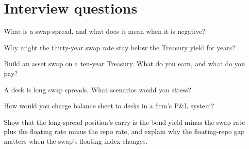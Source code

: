 \section{Interview questions}

\begin{interviewq}\label{iq:s2:swap-spread-and-asset-swap-trades:1}
What is a swap spread, and what does it mean when it is negative?
\end{interviewq}

\begin{interviewq}\label{iq:s2:swap-spread-and-asset-swap-trades:2}
Why might the thirty-year swap rate stay below the Treasury yield for years?
\end{interviewq}

\begin{interviewq}\label{iq:s2:swap-spread-and-asset-swap-trades:3}
Build an asset swap on a ten-year Treasury. What do you earn, and what do you pay?
\end{interviewq}

\begin{interviewq}\label{iq:s2:swap-spread-and-asset-swap-trades:4}
A desk is long swap spreads. What scenarios would you stress?
\end{interviewq}

\begin{interviewq}\label{iq:s2:swap-spread-and-asset-swap-trades:5}
How would you charge balance sheet to desks in a firm's P\&L system?
\end{interviewq}

\begin{interviewq}\label{iq:s2:swap-spread-and-asset-swap-trades:6}
Show that the long-spread position's carry is the bond yield minus the swap rate plus the floating rate minus the repo rate, and explain why the
floating-repo gap matters when the swap's floating index changes.
\end{interviewq}

